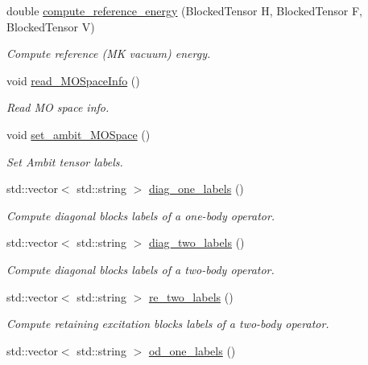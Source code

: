 \begin{DoxyCompactItemize}
double \mbox{\hyperlink{classforte_1_1_s_a_d_s_r_g_a56b5755acb929052bd34a054be1cc804}{compute\+\_\+reference\+\_\+energy}} (Blocked\+Tensor H, Blocked\+Tensor F, Blocked\+Tensor V)
\begin{DoxyCompactList}\small\item\em Compute reference (MK vacuum) energy. \end{DoxyCompactList}\item 
void \mbox{\hyperlink{classforte_1_1_s_a_d_s_r_g_a6cc199a24d0f57fb35c4f21e9b839b79}{read\+\_\+\+M\+O\+Space\+Info}} ()
\begin{DoxyCompactList}\small\item\em Read MO space info. \end{DoxyCompactList}\item 
void \mbox{\hyperlink{classforte_1_1_s_a_d_s_r_g_a7ef96dc22db88e81bac859433cf58a24}{set\+\_\+ambit\+\_\+\+M\+O\+Space}} ()
\begin{DoxyCompactList}\small\item\em Set Ambit tensor labels. \end{DoxyCompactList}\item 
std\+::vector$<$ std\+::string $>$ \mbox{\hyperlink{classforte_1_1_s_a_d_s_r_g_ae64cb65cf45e0f382e1065fad5437993}{diag\+\_\+one\+\_\+labels}} ()
\begin{DoxyCompactList}\small\item\em Compute diagonal blocks labels of a one-\/body operator. \end{DoxyCompactList}\item 
std\+::vector$<$ std\+::string $>$ \mbox{\hyperlink{classforte_1_1_s_a_d_s_r_g_a03160b40a863275a8385bee899599a06}{diag\+\_\+two\+\_\+labels}} ()
\begin{DoxyCompactList}\small\item\em Compute diagonal blocks labels of a two-\/body operator. \end{DoxyCompactList}\item 
std\+::vector$<$ std\+::string $>$ \mbox{\hyperlink{classforte_1_1_s_a_d_s_r_g_aeddbbdbe58f7ed8d6187c87967242ed2}{re\+\_\+two\+\_\+labels}} ()
\begin{DoxyCompactList}\small\item\em Compute retaining excitation blocks labels of a two-\/body operator. \end{DoxyCompactList}\item 
std\+::vector$<$ std\+::string $>$ \mbox{\hyperlink{classforte_1_1_s_a_d_s_r_g_af1da39a2091bfbf9ce8c1852194cba8f}{od\+\_\+one\+\_\+labels}} ()

\end{DoxyCompactItemize}
